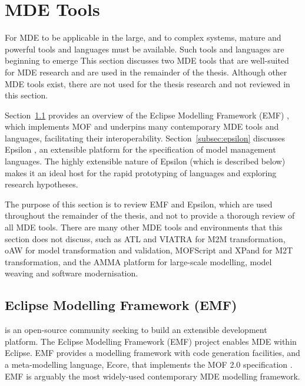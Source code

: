 
\section{MDE Tools}
\label{sec:mde_tools}
For MDE to be applicable in the large, and to complex systems, mature and powerful tools and languages must be available. Such tools and languages are beginning to emerge  This section discusses two MDE tools that are well-suited for MDE research and are used in the remainder of the thesis. Although other MDE tools exist, there are not used for the thesis research and not reviewed in this section.

Section~\ref{subsec:emf} provides an overview of the Eclipse Modelling Framework (EMF) \cite{emf}, which implements MOF and underpins many contemporary MDE tools and languages, facilitating their interoperability. Section~\ref{subsec:epsilon} discusses Epsilon \cite{epsilon}, an extensible platform for the specification of model management languages. The highly extensible nature of Epsilon (which is described below) makes it an ideal host for the rapid prototyping of languages and exploring research hypotheses.  

The purpose of this section is to review EMF and Epsilon, which are used throughout the remainder of the thesis, and not to provide a thorough review of all MDE tools. There are many other MDE tools and environments that this section does not discuss, such as ATL \cite{atl} and VIATRA \cite{viatra} for M2M transformation, oAW \cite{oaw} for model transformation and validation, MOFScript \cite{oldevik05toward} and XPand \cite{xpand} for M2T transformation, and the AMMA \cite{amma} platform for large-scale modelling, model weaving and software modernisation.

\subsection{Eclipse Modelling Framework (EMF)}
\label{subsec:emf}
\cite{eclipse} is an open-source community seeking to build an extensible development platform. The Eclipse Modelling Framework (EMF) project \cite{emf} enables MDE within Eclipse. EMF provides a modelling framework with code generation facilities, and a meta-modelling language, Ecore, that implements the MOF 2.0 specification \cite{mof}. EMF is arguably the most widely-used contemporary MDE modelling framework.


